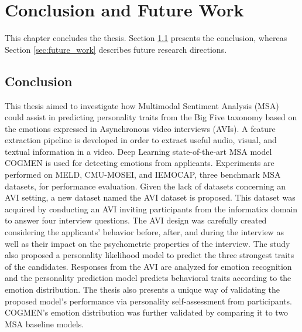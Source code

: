 \chapter{Conclusion and Future Work}
\label{chap:conclusion}
This chapter concludes the thesis. Section \ref{sec:conclusion} presents the conclusion, whereas Section \ref{sec:future_work} describes future research directions.  

\section{Conclusion}
\label{sec:conclusion}
This thesis aimed to investigate how Multimodal Sentiment Analysis (MSA) could assist in predicting personality traits from the Big Five taxonomy based on the emotions expressed in Asynchronous video interviews (AVIs). A feature extraction pipeline is developed in order to extract useful audio, visual, and textual information in a video. Deep Learning state-of-the-art MSA model COGMEN is used for detecting emotions from applicants. Experiments are performed on MELD, CMU-MOSEI, and IEMOCAP, three benchmark MSA datasets, for performance evaluation. Given the lack of datasets concerning an AVI setting, a new dataset named the AVI dataset is proposed. This dataset was acquired by conducting an AVI inviting participants from the informatics domain to answer four interview questions. The AVI design was carefully created considering the applicants' behavior before, after, and during the interview as well as their impact on the psychometric properties of the interview. The study also proposed a personality likelihood model to predict the three strongest traits of the candidates. Responses from the AVI are analyzed for emotion recognition and the personality prediction model predicts behavioral traits according to the emotion distribution. The thesis also presents a unique way of validating the proposed model's performance via personality self-assessment from participants. COGMEN's emotion distribution was further validated by comparing it to two MSA baseline models. \\

